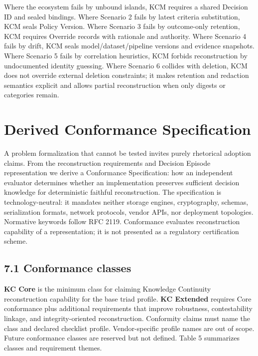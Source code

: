\documentclass[11pt,a4paper]{article}
\begin{document}
Where the ecosystem fails by unbound islands, KCM requires a shared Decision ID and sealed bindings. Where Scenario 2 fails by latest criteria substitution, KCM seals Policy Version. Where Scenario 3 fails by outcome-only retention, KCM requires Override records with rationale and authority. Where Scenario 4 fails by drift, KCM seals model/dataset/pipeline versions and evidence snapshots. Where Scenario 5 fails by correlation heuristics, KCM forbids reconstruction by undocumented identity guessing. Where Scenario 6 collides with deletion, KCM does not override external deletion constraints; it makes retention and redaction semantics explicit and allows partial reconstruction when only digests or categories remain.



\section{Derived Conformance Specification}

A problem formalization that cannot be tested invites purely rhetorical adoption claims. From the reconstruction requirements and Decision Episode representation we derive a Conformance Specification: how an independent evaluator determines whether an implementation preserves sufficient decision knowledge for deterministic faithful reconstruction. The specification is technology-neutral: it mandates neither storage engines, cryptography, schemas, serialization formats, network protocols, vendor APIs, nor deployment topologies. Normative keywords follow RFC 2119. Conformance evaluates reconstruction capability of a representation; it is not presented as a regulatory certification scheme.


\subsection{7.1 Conformance classes}

\textbf{KC Core} is the minimum class for claiming Knowledge Continuity reconstruction capability for the base triad profile. \textbf{KC Extended} requires Core conformance plus additional requirements that improve robustness, contestability linkage, and integrity-oriented reconstruction. Conformity claims must name the class and declared checklist profile. Vendor-specific profile names are out of scope. Future conformance classes are reserved but not defined. Table 5 summarizes classes and requirement themes.
\end{document}

